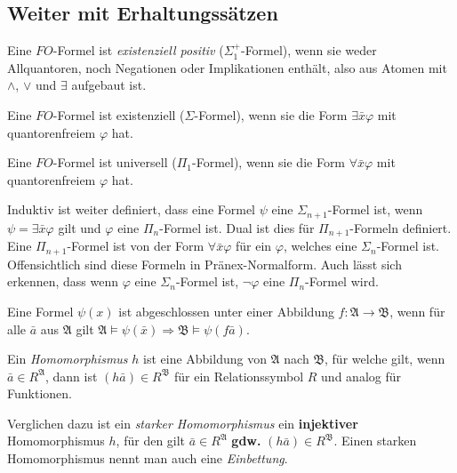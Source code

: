 \subsection*{Weiter mit Erhaltungssätzen}

\begin{definition}
	Eine $FO$-Formel ist \textit{existenziell positiv} ($\Sigma_1^+$-Formel), wenn sie weder Allquantoren, noch Negationen oder Implikationen enthält, also aus Atomen mit $\land$, $\lor$ und $\exists$ aufgebaut ist.
\end{definition}

\begin{definition}
	Eine $FO$-Formel ist existenziell ($\Sigma$-Formel), wenn sie die Form $\exists \bar{x} \varphi$ mit quantorenfreiem $\varphi$ hat.
	
	Eine $FO$-Formel ist universell ($\Pi_1$-Formel), wenn sie die Form $\forall \bar{x} \varphi$ mit quantorenfreiem $\varphi$ hat.
\end{definition}
Induktiv ist weiter definiert, dass eine Formel $\psi$ eine $\Sigma_{n+1}$-Formel ist, wenn $\psi=\exists\bar{x}\varphi$ gilt und $\varphi$ eine $\Pi_n$-Formel ist. Dual ist dies für $\Pi_{n+1}$-Formeln definiert. Eine $\Pi_{n+1}$-Formel ist von der Form $\forall \bar{x}\varphi$ für ein $\varphi$, welches eine $\Sigma_n$-Formel ist. Offensichtlich sind diese Formeln in Pränex-Normalform. Auch lässt sich erkennen, dass wenn $\varphi$ eine $\Sigma_n$-Formel ist, $\neg\varphi$ eine $\Pi_n$-Formel wird.

\begin{definition}[Abgeschlossenheit]
	Eine Formel $\psi(x)$ ist abgeschlossen unter einer Abbildung $f:\mathfrak{A}\to\mathfrak{B}$, wenn für alle $\bar{a}$ aus $\mathfrak{A}$ gilt $\mathfrak{A}\models\psi(\bar{x})\Rightarrow\mathfrak{B}\models\psi(f\bar{a})$.
\end{definition}

Ein \textit{Homomorphismus} $h$ ist eine Abbildung von $\mathfrak{A}$ nach $\mathfrak{B}$, für welche gilt, wenn $\bar{a}\in R^\mathfrak{A}$, dann ist $(h \bar{a})\in R^\mathfrak{B}$ für ein Relationssymbol $R$ und analog für Funktionen.

Verglichen dazu ist ein \textit{starker Homomorphismus} ein \textbf{injektiver} Homomorphismus $h$, für den gilt $\bar{a}\in R^\mathfrak{A}$ \textbf{gdw.} $(h \bar{a})\in R^\mathfrak{B}$. Einen starken Homomorphismus nennt man auch eine \textit{Einbettung}.

